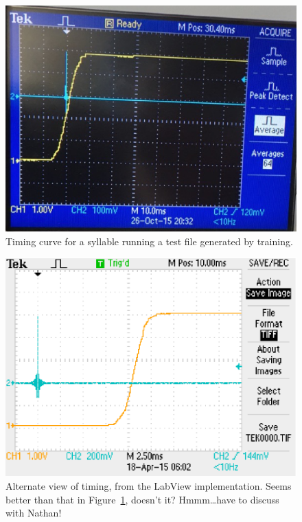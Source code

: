 \documentclass{article}
\newcommand\fig[1]{Figure~\ref{#1}}
\begin{document}
\begin{figure}
  \includegraphics[width=\textwidth]{timing_nathan}
  \caption{Timing curve for a syllable running a test file generated by training.}
  \label{fig:timing_nathan}
\end{figure}

\begin{figure}
  \includegraphics[width=\textwidth]{detector-timing-2}
  \caption{Alternate view of timing, from the LabView implementation. Seems better than that in \fig{fig:timing_nathan}, doesn't it? Hmmm\dots have to discuss with Nathan!}
  \label{fig:timing_ben}
\end{figure}
\end{document}

